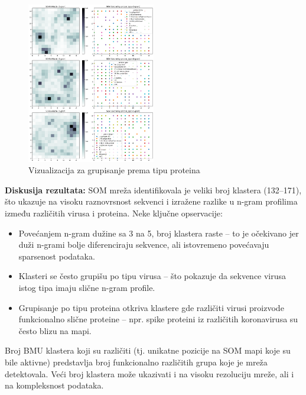 \documentclass[a4paper,12pt]{article}
\begin{document}
\begin{figure}[h!]
    \centering
    \includegraphics[width=0.5\textwidth]{images/som-amino-acid-protein.png}
    \caption{Vizualizacija za grupisanje prema tipu proteina}
    \label{fig:som-struktura3}
\end{figure}

\textbf{Diskusija rezultata:}
SOM mreža identifikovala je veliki broj klastera (132–171), što ukazuje na visoku raznovrsnost sekvenci i izražene razlike u n-gram profilima između različitih virusa i proteina. Neke ključne opservacije:

\begin{itemize}
    \item Povećanjem n-gram dužine sa 3 na 5, broj klastera raste – to je očekivano jer duži n-grami bolje diferenciraju sekvence, ali istovremeno povećavaju sparsenost podataka.
    \item Klasteri se često grupišu po tipu virusa – što pokazuje da sekvence virusa istog tipa imaju slične n-gram profile.
    \item Grupisanje po tipu proteina otkriva klastere gde različiti virusi proizvode funkcionalno slične proteine – npr. spike proteini iz različitih koronavirusa su često blizu na mapi.
\end{itemize}

Broj BMU klastera koji su različiti (tj. unikatne pozicije na SOM mapi koje su bile aktivne) predstavlja broj funkcionalno različitih grupa koje je mreža detektovala. Veći broj klastera može ukazivati i na visoku rezoluciju mreže, ali i na kompleksnost podataka.
\end{document}
